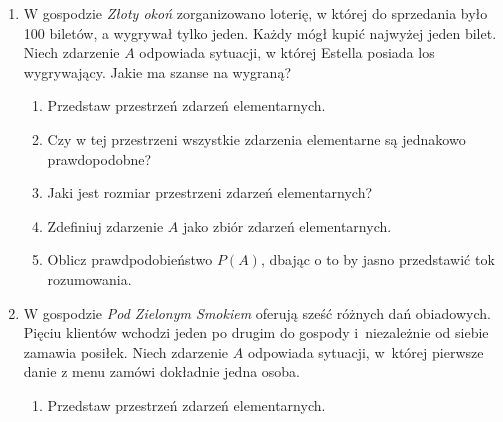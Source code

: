 \documentclass[twoside]{mwart}
\newcommand{\ans}[1]{}
\newcommand{\ans}[1]{\par\emph{Odpowiedź:} #1}
\begin{document}
\begin{enumerate}
\begin{enumerate}
\ans{Alternatywne rozwiązanie korzysta z par uporządkowanych, wtedy wszystkie zbiory są dwa razy bardziej liczne, ale prawdopodobieństwa wychodzą takie same. Można też rozważyć przypadek losowania ze zwracaniem, wtedy $\Omega$ musi składać się z par \emph{uporządkowanych}, $\left|\Omega\right|=100$ no i liczności $A$ oraz $B$, a w konsekwencji prawdopodobieństwa wychodzą trochę inne.}
\end{enumerate}
\item W gospodzie \emph{Złoty okoń} zorganizowano loterię, w której do sprzedania było 100 biletów, a wygrywał tylko jeden. Każdy mógł kupić najwyżej jeden bilet. Niech zdarzenie $A$ odpowiada sytuacji, w której Estella posiada los wygrywający. Jakie ma szanse na wygraną?
\begin{enumerate}%
\item Przedstaw przestrzeń zdarzeń elementarnych. \ans{$\Omega=\{\omega_n|n=1,2,\ldots,100\}$}%
\item Czy w tej przestrzeni wszystkie zdarzenia elementarne są jednakowo prawdopodobne? \ans{Tak (przy czym jest to raczej kwestia założenia)}%
\item Jaki jest rozmiar przestrzeni zdarzeń elementarnych? \ans{$\left|\Omega\right|=100$}%
\item Zdefiniuj zdarzenie $A$ jako zbiór zdarzeń elementarnych. \ans{$A=\{\omega_1$\} (Wybieramy dowolny los jako wygrywający, powiedzmy ten, któremu odpowiada zdarzenie elementarne $\omega_1$)}%
\item Oblicz prawdpodobieństwo $P(A)$, dbając o to by jasno przedstawić tok rozumowania. \ans{
	Na podstawie odpowiedzi w punkcie b możemy posłużyć się prawdopodobieństwem klasycznym:
	$P(A)=\frac{\left|A\right|}{\left|\Omega\right|}=\frac{1}{100}$
}%
\end{enumerate}%
\item W gospodzie \emph{Pod Zielonym Smokiem} oferują sześć różnych dań obiadowych. Pięciu klientów wchodzi jeden po drugim do gospody
i~niezależnie od siebie zamawia posiłek. Niech zdarzenie $A$ odpowiada sytuacji, w~której pierwsze danie z menu zamówi dokładnie jedna osoba.%
\begin{enumerate}%
\item Przedstaw przestrzeń zdarzeń elementarnych. \ans{$\Omega=\{(i_1,\ldots,i_5)|i_j=1,2,\ldots,6\}$
	 Uporządkowane ciągi 5-ciu elementów, w których kolejne pozycje odpowiadają numerom dań zamówionych przez kolejnych klientów.
	 Musimy rozpatrywać wszystkich klientów jednocześnie, ponieważ nasze doświadczenie polega na obserwacji wszystkich klientów na raz (\emph{dokładnie jedna osoba}), a jednemu wynikowi obserwacji musi odpowiadac \emph{dokładnie jedno} zdarzenie elementarne.
}
\end{enumerate}
\end{enumerate}
\end{document}
